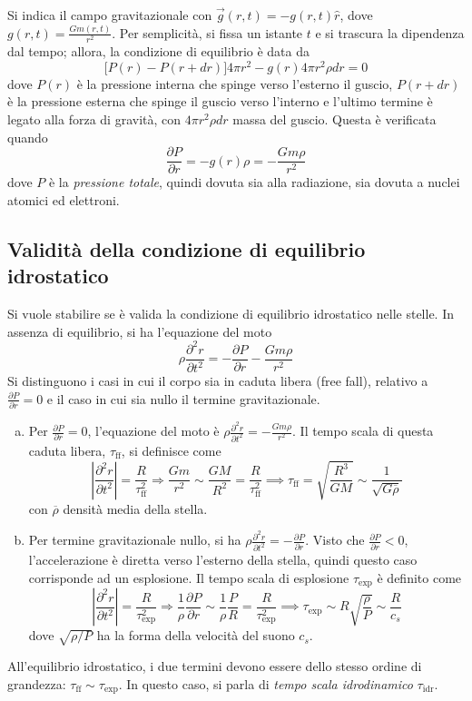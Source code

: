 \documentclass[11pt, a4paper]{scrartcl}
\theoremstyle{style}
\theoremstyle{style1}
\numberwithin{equation}{subsection}
\begin{document}
Si indica il campo gravitazionale con $\vec{g}(r,t) = -g(r,t) \hat{r}$, dove $g(r,t) = \frac{Gm(r,t)}{r^2}$. 
Per semplicit\`a, si fissa un istante $t$ e si trascura la dipendenza dal tempo; allora, la condizione di equilibrio \`e data da 
\[
	\big[P(r) - P(r+dr)\big]4 \pi r^2 - g(r) 4\pi r^2 \rho  dr = 0
\] 
dove $P(r)$ \`e la pressione interna che spinge verso l'esterno il guscio, $P(r+dr)$ \`e la pressione esterna che spinge il guscio verso l'interno e l'ultimo termine \`e legato alla forza di gravit\`a, con $4\pi r^2 \rho dr$ massa del guscio.
Questa \`e verificata quando 
\begin{equation}
	\frac{\partial P}{\partial r}  = - g(r) \rho  = - \frac{G m \rho }{r^2}
\end{equation}
dove $P$ \`e la \textit{pressione totale}, quindi dovuta sia alla radiazione, sia dovuta a nuclei atomici ed elettroni.
\subsection{Validit\`a della condizione di equilibrio idrostatico}
Si vuole stabilire se \`e valida la condizione di equilibrio idrostatico nelle stelle.
In assenza di equilibrio, si ha l'equazione del moto
\begin{equation}
	\rho  \frac{\partial ^2 r}{\partial t^2}  = - \frac{\partial P}{\partial r}  - \frac{G m \rho }{r^2}
\end{equation}
Si distinguono i casi in cui il corpo sia in caduta libera (free fall), relativo a $\frac{\partial P}{\partial r}  =0 $ e il caso in cui sia nullo il termine gravitazionale.
\begin{enumerate}[(a).]
	\item Per $\frac{\partial P}{\partial r} = 0$, l'equazione del moto \`e $\rho  \frac{\partial ^2 r}{\partial t^2}  = - \frac{G m \rho }{r^2}$.
		Il tempo scala di questa caduta libera, $\tau_\text{ff} $, si definisce come
		\[
		 \left\lvert \frac{\partial ^2 r}{\partial t^2}  \right\rvert = \frac{R}{\tau _\text{ff}^2}\Rightarrow  \frac{Gm}{r^2} \sim \frac{GM}{R^2} = \frac{R}{\tau _\text{ff}^2} \implies \tau _\text{ff} = \sqrt{\frac{R^3}{GM}}  \sim \frac{1}{\sqrt{G \overline{\rho }} }
		\] 
		con $\overline{\rho }$ densit\`a media della stella.
	\item Per termine gravitazionale nullo, si ha $\rho \frac{\partial ^2 r}{\partial  t^2} = - \frac{\partial P}{\partial r} $.
		Visto che $\frac{\partial P}{\partial r} < 0$, l'accelerazione \`e diretta verso l'esterno della stella, quindi questo caso corrisponde ad un esplosione. 
		Il tempo scala di esplosione $\tau _\text{exp}$ \`e definito come
		\[
		\left\lvert \frac{\partial ^2r}{\partial t^2}  \right\rvert  = \frac{R}{\tau _\text{exp}^2}\Rightarrow \frac{1}{\rho }\frac{\partial P}{\partial r}  \sim \frac{1}{\rho }\frac{P}{R} = \frac{R}{\tau _\text{exp}^2}\implies \tau _\text{exp} \sim R \sqrt{\frac{\rho }{P}} \sim \frac{R}{c_s}
		\] 
		dove $\sqrt{\rho  / P} $ ha la forma della velocit\`a del suono $c_s$.
\end{enumerate}
All'equilibrio idrostatico, i due termini devono essere dello stesso ordine di grandezza: $\tau _\text{ff}\sim\tau _\text{exp}$. 
In questo caso, si parla di \textit{tempo scala idrodinamico} $\tau _\text{idr}$.
\end{document}
